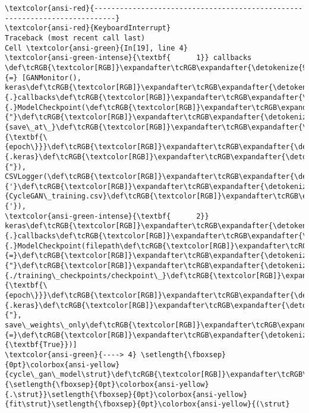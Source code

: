 \documentclass[11pt]{article}
\begin{document}
    \begin{Verbatim}[commandchars=\\\{\}, frame=single, framerule=2mm, rulecolor=\color{outerrorbackground}]
\textcolor{ansi-red}{---------------------------------------------------------------------------}
\textcolor{ansi-red}{KeyboardInterrupt}                         Traceback (most recent call last)
Cell \textcolor{ansi-green}{In[19], line 4}
\textcolor{ansi-green-intense}{\textbf{      1}} callbacks \def\tcRGB{\textcolor[RGB]}\expandafter\tcRGB\expandafter{\detokenize{98,98,98}}{=} [GANMonitor(), keras\def\tcRGB{\textcolor[RGB]}\expandafter\tcRGB\expandafter{\detokenize{98,98,98}}{.}callbacks\def\tcRGB{\textcolor[RGB]}\expandafter\tcRGB\expandafter{\detokenize{98,98,98}}{.}ModelCheckpoint(\def\tcRGB{\textcolor[RGB]}\expandafter\tcRGB\expandafter{\detokenize{175,0,0}}{"}\def\tcRGB{\textcolor[RGB]}\expandafter\tcRGB\expandafter{\detokenize{175,0,0}}{save\_at\_}\def\tcRGB{\textcolor[RGB]}\expandafter\tcRGB\expandafter{\detokenize{175,95,135}}{\textbf{\{epoch\}}}\def\tcRGB{\textcolor[RGB]}\expandafter\tcRGB\expandafter{\detokenize{175,0,0}}{.keras}\def\tcRGB{\textcolor[RGB]}\expandafter\tcRGB\expandafter{\detokenize{175,0,0}}{"}), CSVLogger(\def\tcRGB{\textcolor[RGB]}\expandafter\tcRGB\expandafter{\detokenize{175,0,0}}{'}\def\tcRGB{\textcolor[RGB]}\expandafter\tcRGB\expandafter{\detokenize{175,0,0}}{CycleGAN\_training.csv}\def\tcRGB{\textcolor[RGB]}\expandafter\tcRGB\expandafter{\detokenize{175,0,0}}{'}),
\textcolor{ansi-green-intense}{\textbf{      2}}              keras\def\tcRGB{\textcolor[RGB]}\expandafter\tcRGB\expandafter{\detokenize{98,98,98}}{.}callbacks\def\tcRGB{\textcolor[RGB]}\expandafter\tcRGB\expandafter{\detokenize{98,98,98}}{.}ModelCheckpoint(filepath\def\tcRGB{\textcolor[RGB]}\expandafter\tcRGB\expandafter{\detokenize{98,98,98}}{=}\def\tcRGB{\textcolor[RGB]}\expandafter\tcRGB\expandafter{\detokenize{175,0,0}}{"}\def\tcRGB{\textcolor[RGB]}\expandafter\tcRGB\expandafter{\detokenize{175,0,0}}{./training\_checkpoints/checkpoint\_}\def\tcRGB{\textcolor[RGB]}\expandafter\tcRGB\expandafter{\detokenize{175,95,135}}{\textbf{\{epoch\}}}\def\tcRGB{\textcolor[RGB]}\expandafter\tcRGB\expandafter{\detokenize{175,0,0}}{.keras}\def\tcRGB{\textcolor[RGB]}\expandafter\tcRGB\expandafter{\detokenize{175,0,0}}{"}, save\_weights\_only\def\tcRGB{\textcolor[RGB]}\expandafter\tcRGB\expandafter{\detokenize{98,98,98}}{=}\def\tcRGB{\textcolor[RGB]}\expandafter\tcRGB\expandafter{\detokenize{0,135,0}}{\textbf{True}})]
\textcolor{ansi-green}{----> 4} \setlength{\fboxsep}{0pt}\colorbox{ansi-yellow}{cycle\_gan\_model\strut}\def\tcRGB{\textcolor[RGB]}\expandafter\tcRGB\expandafter{\detokenize{98,98,98}}{\setlength{\fboxsep}{0pt}\colorbox{ansi-yellow}{.\strut}}\setlength{\fboxsep}{0pt}\colorbox{ansi-yellow}{fit\strut}\setlength{\fboxsep}{0pt}\colorbox{ansi-yellow}{(\strut}

\end{Verbatim}
\end{document}
